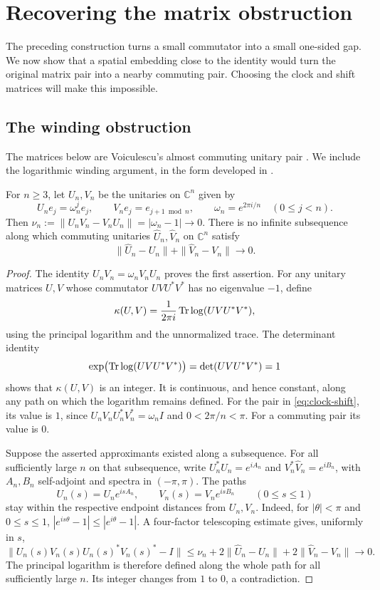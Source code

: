 \section{Recovering the matrix obstruction}\label{sec:obstruction}

The preceding construction turns a small commutator into a small
one-sided gap. We now show that a spatial embedding close to the
identity would turn the original matrix pair into a nearby commuting
pair. Choosing the clock and shift matrices will make this impossible.

\subsection{The winding obstruction}
The matrices below are Voiculescu's almost commuting unitary pair
\cite{Voi1983}. We include the logarithmic winding argument, in the
form developed in \cite{EL1989,Exel1993}.

\begin{lemma}\label{lem:clock}
For $n\geq3$, let $U_n,V_n$ be the unitaries on $\mathbb C^n$ given by
\begin{equation}\label{eq:clock-shift}
 U_ne_j=\omega_n^je_j,\qquad
 V_ne_j=e_{j+1\bmod n},\qquad
 \omega_n=e^{2\pi i/n}\quad(0\leq j<n).
\end{equation}
Then $\nu_n:=\|U_nV_n-V_nU_n\|=|\omega_n-1|\to0$.
There is no infinite subsequence along which commuting unitaries
$\widehat U_n,\widehat V_n$ on $\mathbb C^n$ satisfy
\[
 \|\widehat U_n-U_n\|+\|\widehat V_n-V_n\|\longrightarrow0.
\]
\end{lemma}

\begin{proof}
The identity $U_nV_n=\omega_nV_nU_n$ proves the first assertion.
For any unitary matrices $U,V$ whose commutator $UVU^*V^*$ has no
eigenvalue $-1$, define
\[
 \kappa(U,V)=\frac{1}{2\pi i}\operatorname{Tr}\log(UVU^*V^*),
\]
using the principal logarithm and the unnormalized trace.
The determinant identity
\[
 \exp\bigl(\operatorname{Tr}\log(UVU^*V^*)\bigr)
       =\det(UVU^*V^*)=1
\]
shows that $\kappa(U,V)$ is an integer. It is continuous, and hence
constant, along any path on which the logarithm remains defined.
For the pair in \eqref{eq:clock-shift}, its value is $1$, since
$U_nV_nU_n^*V_n^*=\omega_n I$ and $0<2\pi/n<\pi$.
For a commuting pair its value is $0$.

Suppose the asserted approximants existed along a subsequence.
For all sufficiently large $n$ on that subsequence, write
$U_n^*\widehat U_n=e^{iA_n}$ and
$V_n^*\widehat V_n=e^{iB_n}$, with $A_n,B_n$ self-adjoint and
spectra in $(-\pi,\pi)$. The paths
\[
 U_n(s)=U_ne^{isA_n},\qquad
 V_n(s)=V_ne^{isB_n}\qquad(0\leq s\leq1)
\]
stay within the respective endpoint distances from $U_n,V_n$.
Indeed, for $|\theta|<\pi$ and $0\leq s\leq1$,
$|e^{is\theta}-1|\leq|e^{i\theta}-1|$.
A four-factor telescoping estimate gives, uniformly in $s$,
\[
 \|U_n(s)V_n(s)U_n(s)^*V_n(s)^*-I\|
 \leq \nu_n+2\|\widehat U_n-U_n\|
             +2\|\widehat V_n-V_n\|\longrightarrow0.
\]
The principal logarithm is therefore defined along the whole path
for all sufficiently large $n$. Its integer changes from $1$ to $0$,
a contradiction.
\end{proof}

